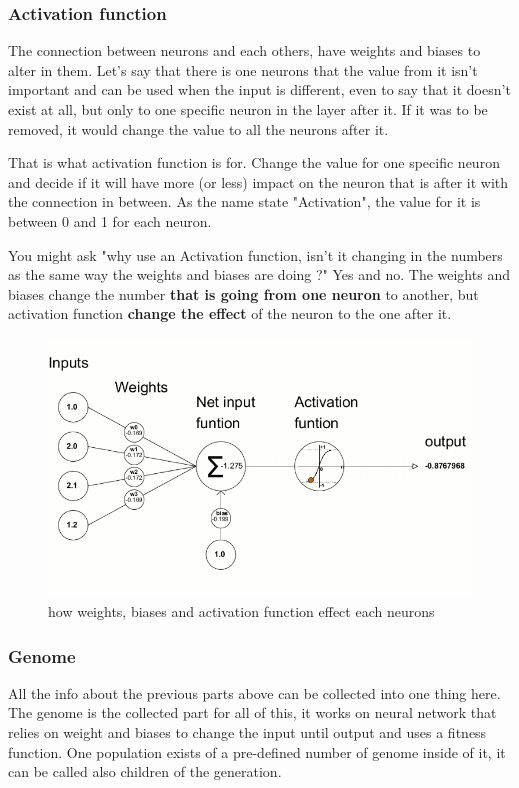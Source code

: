 \subsubsection{Activation function} \label{sec:activation-function}
The connection between neurons and each others, have weights and biases to alter in them. Let's say that there is one neurons that the value from it isn't important and can be used when the input is different, even to say that it doesn't exist at all, but only to one specific neuron in the layer after it. If it was to be removed, it would change the value to all the neurons after it.

That is what activation function is for. Change the value for one specific neuron and decide if it will have more (or less) impact on the neuron that is after it with the connection in between. As the name state "Activation", the value for it is between 0 and 1 for each neuron.

You might ask "why use an Activation function, isn't it changing in the numbers as the same way the weights and biases are doing ?" Yes and no. The weights and biases change the number \textbf{that is going from one neuron} to another, but activation function \textbf{change the effect} of the neuron to the one after it.

\begin{figure}[H]
	\centering
	\includegraphics[width=0.7\linewidth]{usedImages/neuronsNN}
	\caption{how weights, biases and activation function effect each neurons}
	\label{fig:neuronsnn}
\end{figure}

\subsubsection{Genome}\label{sec:genome}
All the info about the previous parts above can be collected into one thing here. The genome is the collected part for all of this, it works on neural network that relies on weight and biases to change the input until output and uses a fitness function. One population exists of a pre-defined number of genome inside of it, it can be called also children of the generation.



